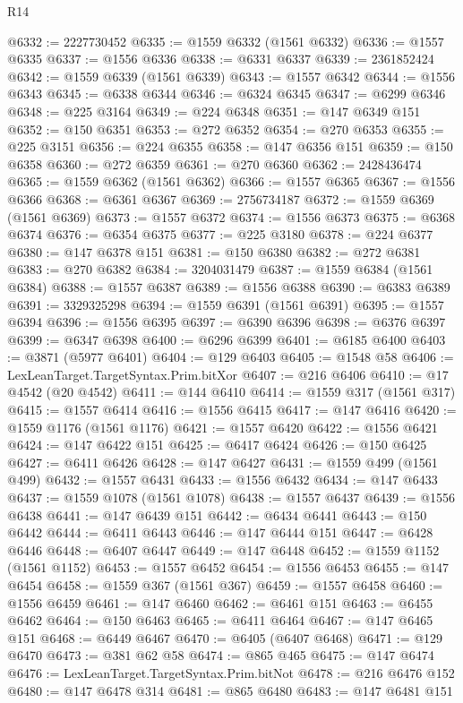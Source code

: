 \begin{lexlean}{R14}
\begin{coremodule}
@6332 := 2227730452
@6335 := @1559 @6332 (@1561 @6332)
@6336 := @1557 @6335
@6337 := @1556 @6336
@6338 := @6331 @6337
@6339 := 2361852424
@6342 := @1559 @6339 (@1561 @6339)
@6343 := @1557 @6342
@6344 := @1556 @6343
@6345 := @6338 @6344
@6346 := @6324 @6345
@6347 := @6299 @6346
@6348 := @225 @3164
@6349 := @224 @6348
@6351 := @147 @6349 @151
@6352 := @150 @6351
@6353 := @272 @6352
@6354 := @270 @6353
@6355 := @225 @3151
@6356 := @224 @6355
@6358 := @147 @6356 @151
@6359 := @150 @6358
@6360 := @272 @6359
@6361 := @270 @6360
@6362 := 2428436474
@6365 := @1559 @6362 (@1561 @6362)
@6366 := @1557 @6365
@6367 := @1556 @6366
@6368 := @6361 @6367
@6369 := 2756734187
@6372 := @1559 @6369 (@1561 @6369)
@6373 := @1557 @6372
@6374 := @1556 @6373
@6375 := @6368 @6374
@6376 := @6354 @6375
@6377 := @225 @3180
@6378 := @224 @6377
@6380 := @147 @6378 @151
@6381 := @150 @6380
@6382 := @272 @6381
@6383 := @270 @6382
@6384 := 3204031479
@6387 := @1559 @6384 (@1561 @6384)
@6388 := @1557 @6387
@6389 := @1556 @6388
@6390 := @6383 @6389
@6391 := 3329325298
@6394 := @1559 @6391 (@1561 @6391)
@6395 := @1557 @6394
@6396 := @1556 @6395
@6397 := @6390 @6396
@6398 := @6376 @6397
@6399 := @6347 @6398
@6400 := @6296 @6399
@6401 := @6185 @6400
@6403 := @3871 (@5977 @6401)
@6404 := @129 @6403
@6405 := @1548 @58
@6406 := LexLeanTarget.TargetSyntax.Prim.bitXor
@6407 := @216 @6406
@6410 := @17 @4542 (@20 @4542)
@6411 := @144 @6410
@6414 := @1559 @317 (@1561 @317)
@6415 := @1557 @6414
@6416 := @1556 @6415
@6417 := @147 @6416
@6420 := @1559 @1176 (@1561 @1176)
@6421 := @1557 @6420
@6422 := @1556 @6421
@6424 := @147 @6422 @151
@6425 := @6417 @6424
@6426 := @150 @6425
@6427 := @6411 @6426
@6428 := @147 @6427
@6431 := @1559 @499 (@1561 @499)
@6432 := @1557 @6431
@6433 := @1556 @6432
@6434 := @147 @6433
@6437 := @1559 @1078 (@1561 @1078)
@6438 := @1557 @6437
@6439 := @1556 @6438
@6441 := @147 @6439 @151
@6442 := @6434 @6441
@6443 := @150 @6442
@6444 := @6411 @6443
@6446 := @147 @6444 @151
@6447 := @6428 @6446
@6448 := @6407 @6447
@6449 := @147 @6448
@6452 := @1559 @1152 (@1561 @1152)
@6453 := @1557 @6452
@6454 := @1556 @6453
@6455 := @147 @6454
@6458 := @1559 @367 (@1561 @367)
@6459 := @1557 @6458
@6460 := @1556 @6459
@6461 := @147 @6460
@6462 := @6461 @151
@6463 := @6455 @6462
@6464 := @150 @6463
@6465 := @6411 @6464
@6467 := @147 @6465 @151
@6468 := @6449 @6467
@6470 := @6405 (@6407 @6468)
@6471 := @129 @6470
@6473 := @381 @62 @58
@6474 := @865 @465
@6475 := @147 @6474
@6476 := LexLeanTarget.TargetSyntax.Prim.bitNot
@6478 := @216 @6476 @152
@6480 := @147 @6478 @314
@6481 := @865 @6480
@6483 := @147 @6481 @151

\end{coremodule}
\end{lexlean}
